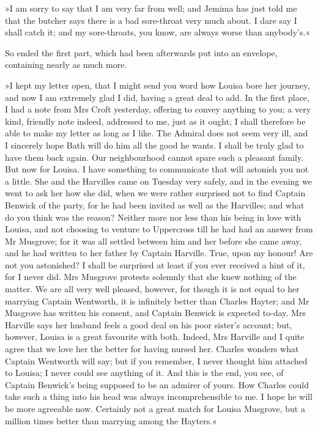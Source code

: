 »I am sorry to say that I am very far from well; and Jemima has just told me that the butcher says there is a bad sore-throat very much about. I dare say I shall catch it; and my sore-throats, you know, are always worse than anybody's.«

So ended the first part, which had been afterwards put into an envelope, containing nearly as much more.

»I kept my letter open, that I might send you word how Louisa bore her journey, and now I am extremely glad I did, having a great deal to add. In the first place, I had a note from Mrs Croft yesterday, offering to convey anything to you; a very kind, friendly note indeed, addressed to me, just as it ought; I shall therefore be able to make my letter as long as I like. The Admiral does not seem very ill, and I sincerely hope Bath will do him all the good he wants. I shall be truly glad to have them back again. Our neighbourhood cannot spare such a pleasant family. But now for Louisa. I have something to communicate that will astonish you not a little. She and the Harvilles came on Tuesday very safely, and in the evening we went to ask her how she did, when we were rather surprised not to find Captain Benwick of the party, for he had been invited as well as the Harvilles; and what do you think was the reason? Neither more nor less than his being in love with Louisa, and not choosing to venture to Uppercross till he had had an answer from Mr Musgrove; for it was all settled between him and her before she came away, and he had written to her father by Captain Harville. True, upon my honour! Are not you astonished? I shall be surprised at least if you ever received a hint of it, for I never did. Mrs Musgrove protests solemnly that she knew nothing of the matter. We are all very well pleased, however, for though it is not equal to her marrying Captain Wentworth, it is infinitely better than Charles Hayter; and Mr Musgrove has written his consent, and Captain Benwick is expected to-day. Mrs Harville says her husband feels a good deal on his poor sister's account; but, however, Louisa is a great favourite with both. Indeed, Mrs Harville and I quite agree that we love her the better for having nursed her. Charles wonders what Captain Wentworth will say; but if you remember, I never thought him attached to Louisa; I never could see anything of it. And this is the end, you see, of Captain Benwick's being supposed to be an admirer of yours. How Charles could take such a thing into his head was always incomprehensible to me. I hope he will be more agreeable now. Certainly not a great match for Louisa Musgrove, but a million times better than marrying among the Hayters.«

